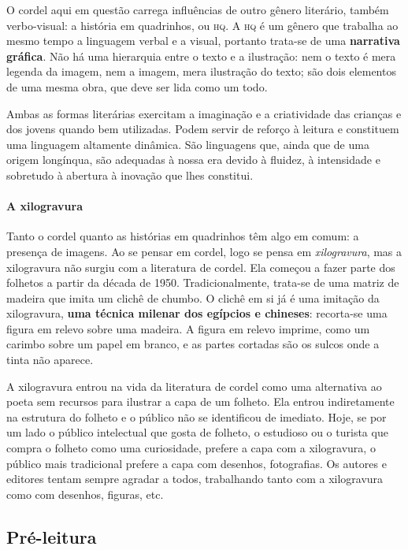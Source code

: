 \documentclass[11pt]{extarticle}
\begin{document}
O cordel aqui em questão carrega influências de outro gênero literário, também
verbo-visual: a história em quadrinhos, ou \textsc{hq}. A \textsc{hq} é um 
gênero que trabalha ao mesmo tempo a linguagem verbal e a visual, portanto trata-se de 
uma \textbf{narrativa gráfica}. Não há uma hierarquia entre o texto e a ilustração: nem 
o texto é mera legenda da imagem, nem a imagem, mera ilustração do texto; são dois elementos 
de uma mesma obra, que deve ser lida como um todo.

Ambas as formas literárias exercitam a imaginação e a criatividade das crianças e dos jovens 
quando bem utilizadas. Podem servir de reforço à leitura e constituem uma linguagem altamente dinâmica. 
São linguagens que, ainda que de uma origem longínqua, são adequadas à nossa era devido à fluidez, 
à intensidade e sobretudo à abertura à inovação que lhes constitui.

\paragraph{A xilogravura}

Tanto o cordel quanto as histórias em quadrinhos têm algo em comum:
a presença de imagens. Ao se pensar em cordel, logo se pensa em \textit{xilogravura}, 
mas a xilogravura não surgiu com a literatura de cordel. Ela começou a fazer
parte dos folhetos a partir da década de 1950. Tradicionalmente, trata-se
de uma matriz de madeira que imita um clichê de chumbo. O clichê em si 
já é uma imitação da xilogravura, \textbf{uma técnica milenar dos egípcios
e chineses}: recorta-se uma figura em relevo sobre uma madeira. A figura 
em relevo imprime, como um carimbo sobre um papel em branco, e as partes
cortadas são os sulcos onde a tinta não aparece. 

A xilogravura entrou na vida da literatura de cordel como uma alternativa 
ao poeta sem recursos para ilustrar a capa de um folheto. Ela entrou indiretamente na 
estrutura do folheto e o público não se identificou de imediato. Hoje, se por um lado 
o público intelectual que gosta de folheto, o estudioso ou o turista que compra o 
folheto como uma curiosidade, prefere a capa com a xilogravura, o público mais 
tradicional prefere a capa com desenhos, fotografias. 
Os autores e editores tentam sempre agradar a todos, trabalhando tanto com a xilogravura 
como com desenhos, figuras, etc.

\subsection{Pré-leitura}
\end{document}
